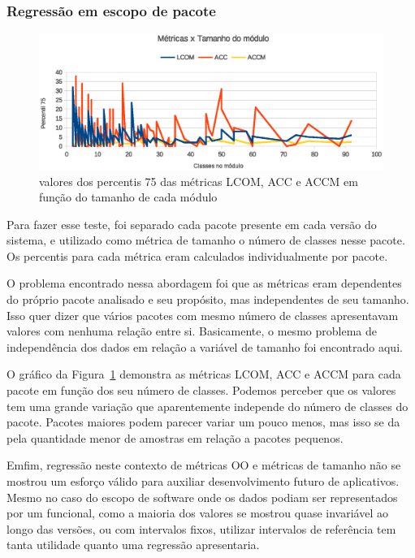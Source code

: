 \subsubsection{Regressão em escopo de pacote}

\begin{figure}[!htb]
\centering
\includegraphics [keepaspectratio=true,scale=0.7]{figuras/metricasxtamanhomodulo.eps}
\caption{valores dos percentis 75 das métricas LCOM, ACC e ACCM em função do tamanho de cada módulo}
\label{fig:metricasxtamanhomodulo}
\end{figure}

Para fazer esse teste, foi separado cada pacote presente em cada versão do sistema, e utilizado como métrica de tamanho o número de classes nesse pacote. Os percentis para cada métrica eram calculados individualmente por pacote.

O problema encontrado nessa abordagem foi que as métricas eram dependentes do próprio pacote analisado e seu propósito, mas independentes de seu tamanho. Isso quer dizer que vários pacotes com mesmo número de classes apresentavam valores com nenhuma relação entre si. Basicamente, o mesmo problema de independência dos dados em relação a variável de tamanho foi encontrado aqui.

O gráfico da Figura~\ref{fig:metricasxtamanhomodulo} demonstra as métricas LCOM, ACC e ACCM para cada pacote em função dos seu número de classes. Podemos perceber que os valores tem uma grande variação que aparentemente independe do número de classes do pacote. Pacotes maiores podem parecer variar um pouco menos, mas isso se da pela quantidade menor de amostras em relação a pacotes pequenos.

Emfim, regressão neste contexto de métricas OO e métricas de tamanho não se mostrou um esforço válido para auxiliar desenvolvimento futuro de aplicativos. Mesmo no caso do escopo de software onde os dados podiam ser representados por um funcional, como a maioria dos valores se mostrou quase invariável ao longo das versões, ou com intervalos fixos, utilizar intervalos de referência tem tanta utilidade quanto uma regressão apresentaria. 

